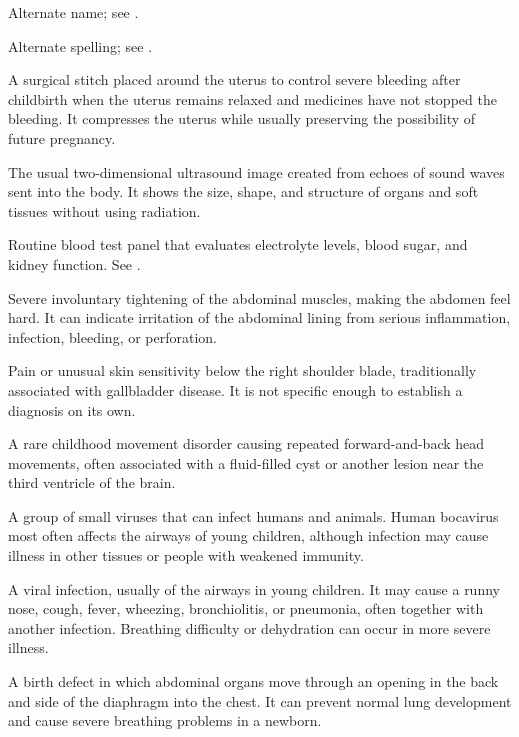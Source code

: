  Alternate name; see .

 Alternate spelling; see .

 A surgical stitch placed around the uterus to control severe bleeding after childbirth when the uterus remains relaxed and medicines have not stopped the bleeding. It compresses the uterus while usually preserving the possibility of future pregnancy.

 The usual two-dimensional ultrasound image created from echoes of sound waves sent into the body. It shows the size, shape, and structure of organs and soft tissues without using radiation.

 Routine blood test panel that evaluates electrolyte levels, blood sugar, and kidney function. See .

 Severe involuntary tightening of the abdominal muscles, making the abdomen feel hard. It can indicate irritation of the abdominal lining from serious inflammation, infection, bleeding, or perforation.

 Pain or unusual skin sensitivity below the right shoulder blade, traditionally associated with gallbladder disease. It is not specific enough to establish a diagnosis on its own.

 A rare childhood movement disorder causing repeated forward-and-back head movements, often associated with a fluid-filled cyst or another lesion near the third ventricle of the brain.

 A group of small viruses that can infect humans and animals. Human bocavirus most often affects the airways of young children, although infection may cause illness in other tissues or people with weakened immunity.

 A viral infection, usually of the airways in young children. It may cause a runny nose, cough, fever, wheezing, bronchiolitis, or pneumonia, often together with another infection. Breathing difficulty or dehydration can occur in more severe illness.

 A birth defect in which abdominal organs move through an opening in the back and side of the diaphragm into the chest. It can prevent normal lung development and cause severe breathing problems in a newborn.


